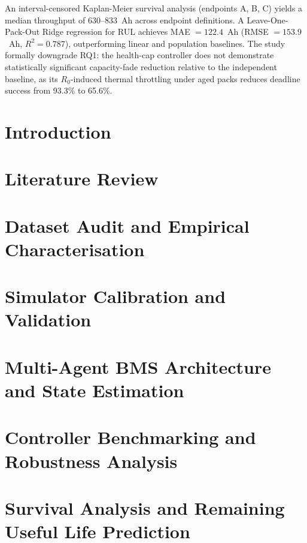 \documentclass[a4paper, 12pt]{report}
\theoremstyle{definition}
\begin{document}
An interval-censored Kaplan-Meier survival analysis (endpoints A, B,
C) yields a median throughput of $630$--$833$~Ah across endpoint
definitions. A Leave-One-Pack-Out Ridge regression for RUL achieves
MAE $= 122.4$~Ah (RMSE $= 153.9$~Ah, $R^2 = 0.787$), outperforming
linear and population baselines. The study formally downgrade RQ1:
the health-cap controller does not demonstrate statistically
significant capacity-fade reduction relative to the independent
baseline, as its $R_0$-induced thermal throttling under aged packs
reduces deadline success from 93.3\% to 65.6\%.

\clearpage
{}
\setcounter{page}{1}

\chapter{Introduction}


\chapter{Literature Review}


\chapter{Dataset Audit and Empirical Characterisation}


\chapter{Simulator Calibration and Validation}


\chapter{Multi-Agent BMS Architecture and State Estimation}


\chapter{Controller Benchmarking and Robustness Analysis}


\chapter{Survival Analysis and Remaining Useful Life Prediction}

\end{document}

